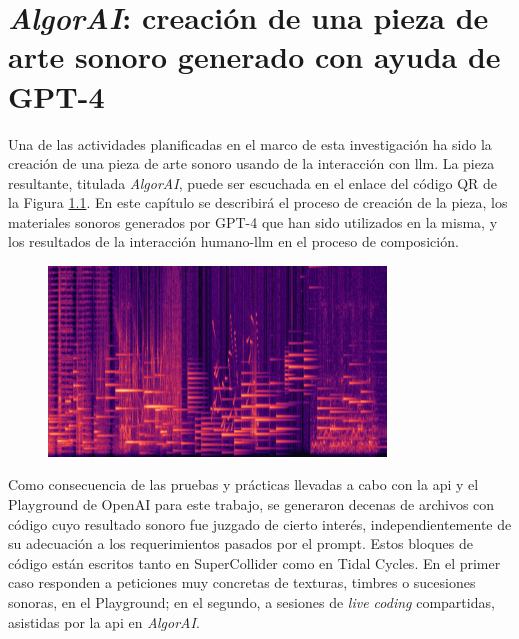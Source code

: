 \chapter{\emph{AlgorAI}: creación de una pieza de arte sonoro generado con ayuda de GPT-4}
\label{chap:algorai}



Una de las actividades planificadas en el marco de esta investigación ha sido la creación de una pieza de arte sonoro usando de la interacción con \gls{llm}. La pieza resultante, titulada \emph{AlgorAI}, puede ser escuchada en el enlace del código QR de la Figura \ref{fig:sonograma_algorai}. En este capítulo se describirá el proceso de creación de la pieza, los materiales sonoros generados por GPT-4 que han sido utilizados en la misma, y los resultados de la interacción humano-\gls{llm} en el proceso de composición.

\begin{figure}[H]
    \centering
    \includegraphics[width=0.8\textwidth]{./figuras/sonograma_02.png}
    \source{\propio}
    \label{fig:sonograma_algorai}
\end{figure}

Como consecuencia de las pruebas y prácticas llevadas a cabo con la \gls{api} y el Playground de OpenAI para este trabajo, se generaron decenas de archivos con código cuyo resultado sonoro fue juzgado de cierto interés, independientemente de su adecuación a los requerimientos pasados por el prompt. Estos bloques de código están escritos tanto en SuperCollider como en Tidal Cycles. En el primer caso responden a peticiones muy concretas de texturas, timbres o sucesiones sonoras, en el Playground; en el segundo, a sesiones de \emph{live coding} compartidas, asistidas por la \gls{api} en \emph{AlgorAI}.

